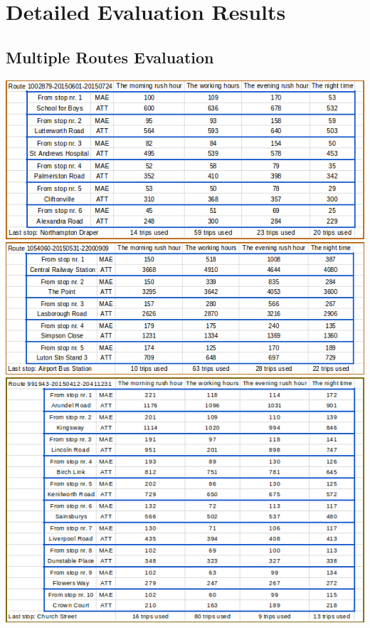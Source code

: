 \documentclass[12pt,a4paper,oneside,openright]{report}
\begin{document}
\chapter{Detailed Evaluation Results}

\section{Multiple Routes Evaluation}

\label{B1}

\includegraphics[width=\textwidth]{figs/table_of_1002879.png}
\includegraphics[width=\textwidth]{figs/table_of_1054060.png}
\includegraphics[width=\textwidth]{figs/table_of_991943.png}
\end{document}

